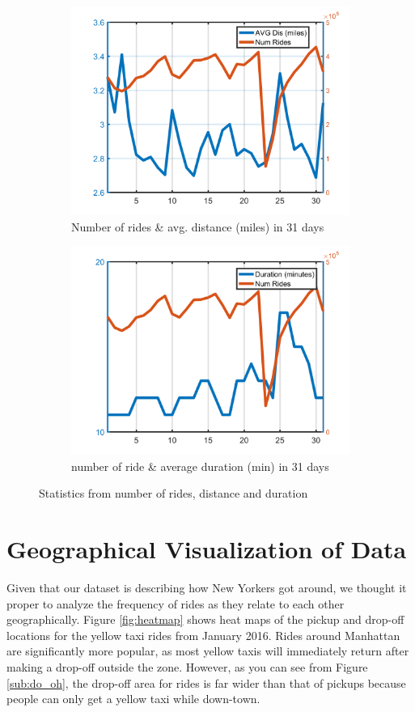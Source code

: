 \documentclass{article}
\begin{document}
\begin{figure}[H]
\begin{subfigure}{.5\linewidth}
  \centering
  \includegraphics[width=.8\linewidth]{numride_dom}
  \caption{Number of rides \& avg. distance (miles) in 31 days}
  \label{fig:sub5}
\end{subfigure}%
\begin{subfigure}{.5\linewidth}
  \centering
  \includegraphics[width=.8\linewidth]{numride_dom_dur}
  \caption{number of ride \& average duration (min) in 31 days}
  \label{fig:sub6}
\end{subfigure}

\caption{Statistics from number of rides, distance and duration}
\label{fig:ride_stats}
\end{figure}

\section{Geographical Visualization of Data}
Given that our dataset is describing how New Yorkers got around, we thought it proper to analyze the frequency of rides as they relate to each other geographically. Figure \ref{fig:heatmap} shows heat maps of the pickup and drop-off locations for the yellow taxi rides from January 2016. Rides around Manhattan are significantly more popular, as most yellow taxis will immediately return after making a drop-off outside the zone. However, as you can see from Figure \ref{sub:do_oh}, the drop-off area for rides is far wider than that of pickups because people can only get a yellow taxi while down-town. 
\end{document}
